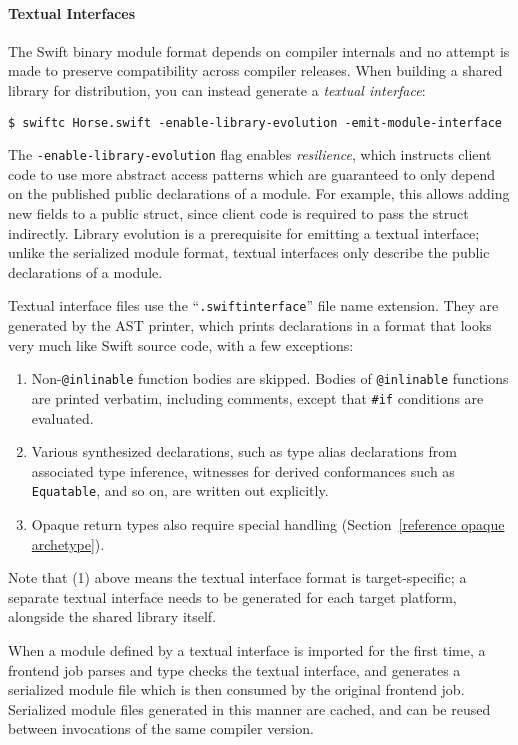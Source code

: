 \documentclass[a4paper,headsepline,bibliography=totoc,toc=flat,fleqn,twoside=semi]{scrbook}
\theoremstyle{definition}
\theoremstyle{definition}
\theoremstyle{definition}
\begin{document}
\paragraph{Textual Interfaces} The Swift binary module format depends on compiler internals and no attempt is made to preserve compatibility across compiler releases. When building a shared library for distribution, you can instead generate a \emph{textual interface}:
\begin{Verbatim}
$ swiftc Horse.swift -enable-library-evolution -emit-module-interface
\end{Verbatim}
The \texttt{-enable-library-evolution} flag enables \emph{resilience}, which instructs client code to use more abstract access patterns which are guaranteed to only depend on the published public declarations of a module. For example, this allows adding new fields to a public struct, since client code is required to pass the struct indirectly. Library evolution is a prerequisite for emitting a textual interface; unlike the serialized module format, textual interfaces only describe the public declarations of a module.

Textual interface files use the ``\texttt{.swiftinterface}'' file name extension. They are generated by the AST printer, which prints declarations in a format that looks very much like Swift source code, with a few exceptions:
\begin{enumerate}
\item Non-\texttt{@inlinable} function bodies are skipped. Bodies of \texttt{@inlinable} functions are printed verbatim, including comments, except that \verb|#if| conditions are evaluated.
\item Various synthesized declarations, such as type alias declarations from associated type inference, witnesses for derived conformances such as \texttt{Equatable}, and so on, are written out explicitly.
\item Opaque return types also require special handling (Section~\ref{reference opaque archetype}).
\end{enumerate}
Note that (1) above means the textual interface format is target-specific; a separate textual interface needs to be generated for each target platform, alongside the shared library itself.

When a module defined by a textual interface is imported for the first time, a frontend job parses and type checks the textual interface, and generates a serialized module file which is then consumed by the original frontend job. Serialized module files generated in this manner are cached, and can be reused between invocations of the same compiler version.
\end{document}
